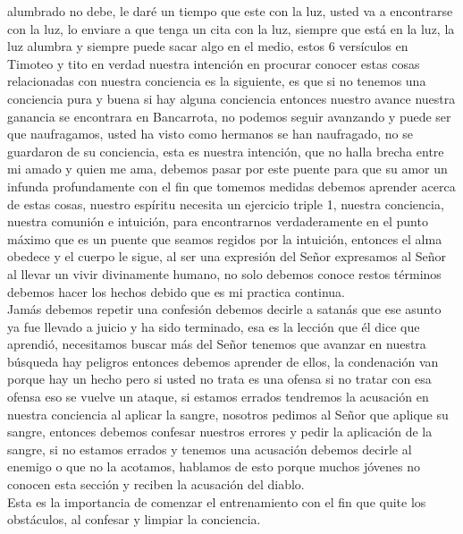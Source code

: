 \documentclass[12pt]{article}
\begin{document}
alumbrado no debe, le daré un tiempo que  este con la luz, usted va a encontrarse con la luz, lo enviare a que tenga un cita con la luz,  siempre que  está en la luz, la luz alumbra y siempre puede sacar algo en el medio, estos 6 versículos en Timoteo y tito en verdad nuestra intención en procurar conocer estas cosas relacionadas con nuestra conciencia es la siguiente, es que si no tenemos una conciencia pura y buena si hay alguna conciencia entonces nuestro avance nuestra ganancia se encontrara en Bancarrota, no podemos seguir avanzando y puede ser que naufragamos, usted ha visto como hermanos se han naufragado, no se guardaron de su conciencia, esta es nuestra intención, que no halla brecha entre mi amado y quien me ama, debemos pasar por este puente para que su amor un infunda profundamente con el fin que tomemos medidas debemos aprender acerca de estas cosas, nuestro espíritu necesita un ejercicio triple 1, nuestra conciencia, nuestra comunión e intuición, para encontrarnos verdaderamente en el punto máximo que es un puente que seamos regidos por la intuición, entonces el alma obedece y el cuerpo le sigue, al ser una expresión del Señor expresamos al Señor al llevar un vivir divinamente humano, no solo debemos conoce restos términos debemos hacer los hechos debido que es mi practica continua.\\

Jamás debemos repetir una confesión debemos decirle  a satanás que ese asunto ya fue llevado a juicio y ha sido terminado, esa es la lección que él dice que aprendió, necesitamos buscar más del Señor tenemos que avanzar en nuestra búsqueda hay peligros entonces debemos aprender de ellos, la condenación van porque hay un hecho pero si usted no trata es una ofensa si no tratar con esa ofensa eso se vuelve un ataque, si estamos errados tendremos la acusación en nuestra conciencia al aplicar la sangre, nosotros pedimos al Señor que aplique su sangre, entonces debemos confesar nuestros errores y pedir la aplicación de la sangre, si no estamos errados y tenemos una acusación debemos decirle al enemigo o que no la acotamos, hablamos de esto porque muchos jóvenes no conocen esta sección y reciben la acusación del diablo.\\

Esta es la importancia de comenzar el entrenamiento con el fin que quite los obstáculos, al confesar y limpiar la conciencia. \\
\end{document}
